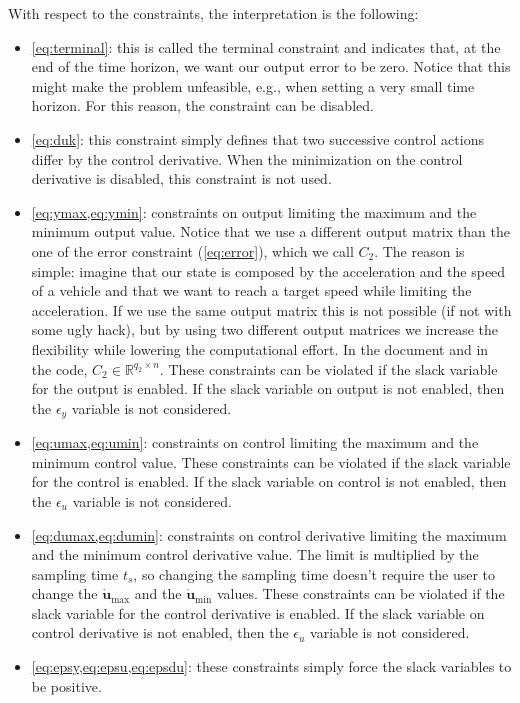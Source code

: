 \documentclass[10pt,a4paper]{article}
\newcommand{\dumin}{\ensuremath{\bm{\dot{u}}_\text{min}}\xspace}
\newcommand{\dumax}{\ensuremath{\bm{\dot{u}}_\text{max}}\xspace}
\newcommand{\epsy}{\ensuremath{\epsilon_{y}}\xspace}
\newcommand{\epsu}{\ensuremath{\epsilon_{u}}\xspace}
\newcommand{\R}{\ensuremath{\mathbb{R}\xspace}}
\newcommand{\ts}{\ensuremath{t_s}}
\newcommand{\Cc}{\ensuremath{C_2}}
\begin{document}
With respect to the constraints, the interpretation is the following:
\begin{itemize}
    \item \cref{eq:terminal}: this is called the terminal constraint and indicates that, at the end of the time horizon, we want our output error to be zero. Notice that this might make the problem unfeasible, e.g., when setting a very small time horizon. For this reason, the constraint can be disabled.
    \item \cref{eq:duk}: this constraint simply defines that two successive control actions differ by the control derivative. When the minimization on the control derivative is disabled, this constraint is not used.
    \item \cref{eq:ymax,eq:ymin}: constraints on output limiting the maximum and the minimum output value. Notice that we use a different output matrix than the one of the error constraint (\cref{eq:error}), which we call \Cc. The reason is simple: imagine that our state is composed by the acceleration and the speed of a vehicle and that we want to reach a target speed while limiting the acceleration. If we use the same output matrix this is not possible (if not with some ugly hack), but by using two different output matrices we increase the flexibility while lowering the computational effort. In the document and in the code, $\Cc \in \R^{q_2 \times n}$. These constraints can be violated if the slack variable for the output is enabled. If the slack variable on output is not enabled, then the \epsy variable is not considered.
    \item \cref{eq:umax,eq:umin}: constraints on control limiting the maximum and the minimum control value. These constraints can be violated if the slack variable for the control is enabled. If the slack variable on control is not enabled, then the \epsu variable is not considered.
    \item \cref{eq:dumax,eq:dumin}: constraints on control derivative limiting the maximum and the minimum control derivative value. The limit is multiplied by the sampling time \ts, so changing the sampling time doesn't require the user to change the \dumax and the \dumin values. These constraints can be violated if the slack variable for the control derivative is enabled. If the slack variable on control derivative is not enabled, then the \epsu variable is not considered.
    \item \cref{eq:epsy,eq:epsu,eq:epsdu}: these constraints simply force the slack variables to be positive.
\end{itemize}
\end{document}
